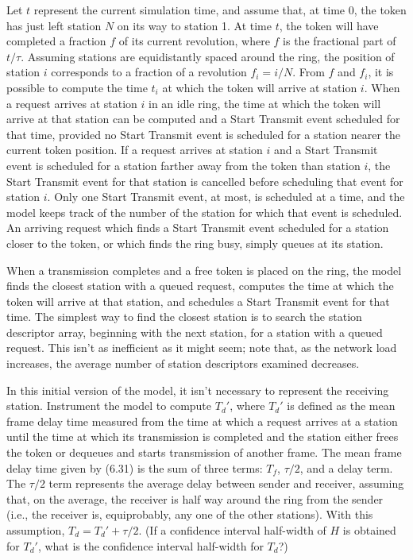 Let $t$ represent the current simulation time, and assume that, at time 0, the token has just left station $N$ on its way to station 1. At time $t$, the token will have completed a fraction $f$ of its current revolution, where $f$ is the fractional part of $t/\tau$. Assuming stations are equidistantly spaced around the ring, the position of station $i$ corresponds to a fraction of a revolution $f_i=i/N$. From $f$ and $f_i$, it is possible to compute the time $t_i$ at which the token will arrive at station $i$. When a request arrives at station $i$ in an idle ring, the time at which the token will arrive at that station can be computed and a Start Transmit event scheduled for that time, provided no Start Transmit event is scheduled for a station nearer the current token position. If a request arrives at station $i$ and a Start Transmit event is scheduled for a station farther away from the token than station $i$, the Start Transmit event for that station is cancelled before scheduling that event for station $i$. Only one Start Transmit event, at most, is scheduled at a time, and the model keeps track of the number of the station for which that event is scheduled. An arriving request which finds a Start Transmit event scheduled for a station closer to the token, or which finds the ring busy, simply queues at its station.

When a transmission completes and a free token is placed on the ring, the model finds the closest station with a queued request, computes the time at which the token will arrive at that station, and schedules a Start Transmit event for that time. The simplest way to find the closest station is to search the station descriptor array, beginning with the next station, for a station with a queued request. This isn't as inefficient as it might seem; note that, as the network load increases, the average number of station descriptors examined decreases.

In this initial version of the model, it isn't necessary to represent the receiving station. Instrument the model to compute $T_d'$, where $T_d'$ is defined as the mean frame delay time measured from the time at which a request arrives at a station until the time at which its transmission is completed and the station either frees the token or dequeues and starts transmission of another frame. The mean frame delay time given by (6.31) is the sum of three terms: $T_f$, $\tau/2$, and a delay term. The $\tau/2$ term represents the average delay between sender and receiver, assuming that, on the average, the receiver is half way around the ring from the sender (i.e., the receiver is, equiprobably, any one of the other stations). With this assumption, $T_d=T_d'+\tau/2$. (If a confidence interval half-width of $H$ is obtained for $T_d'$, what is the confidence interval half-width for $T_d$?)



